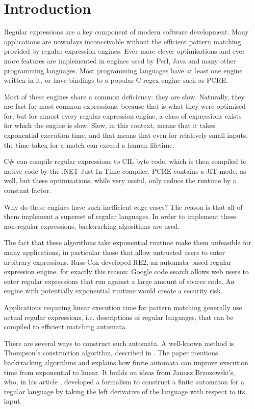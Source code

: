\chapter{Introduction}

Regular expressions are a key component of modern software development. Many
applications are nowadays inconceivable without the efficient pattern matching
provided by regular expression engines. Ever more clever optimisations and ever
more features are implemented in engines used by Perl, Java and many other
programming languages. Most programming languages have at least one engine
written in it, or have bindings to a popular C regex engine such as PCRE.

Most of these engines share a common deficiency: they are slow. Naturally, they
are fast for most common expressions, because that is what they were optimised
for, but for almost every regular expression engine, a class of expressions
exists for which the engine is slow. Slow, in this context, means that it takes
exponential execution time, and that means that even for relatively small
inputs, the time taken for a match can exceed a human lifetime.

C\# can compile regular expressions to CIL byte code, which is then compiled to
native code by the .NET Just-In-Time compiler. PCRE contains a JIT mode, as
well, but these optimisations, while very useful, only reduce the runtime by a
constant factor.

Why do these engines have such inefficient edge-cases? The reason is that all of
them implement a superset of regular languages. In order to implement these
non-regular expressions, backtracking algorithms are used.

The fact that these algorithms take exponential runtime make them unfeasible for
many applications, in particular those that allow untrusted users to enter
arbitrary expressions. Russ Cox developed RE2, an automata based regular
expression engine, for exactly this reason: Google code search allows web users
to enter regular expressions that run against a large amount of source code. An
engine with potentially exponential runtime would create a security risk.

Applications requiring linear execution time for pattern matching generally use
actual regular expressions, i.e. descriptions of regular languages, that can be
compiled to efficient matching automata.

There are several ways to construct such automata. A well-known method is
Thompson's construction algorithm, described in \cite{thompson}. The paper
mentions backtracking algorithms and explains how finite automata can improve
execution time from exponential to linear. It builds on ideas from Janusz
Brzozowski's, who, in his article \cite{brzozowski}, developed a formalism to
construct a finite automaton for a regular language by taking the left
derivative of the language with respect to its input.


